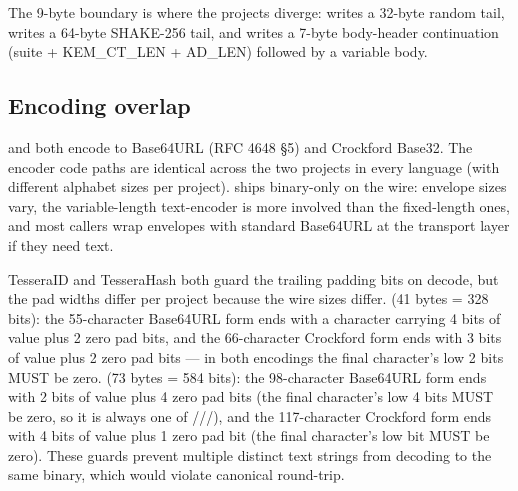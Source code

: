 The 9-byte boundary is where the projects diverge: \tesseraid{} writes a 32-byte random tail, \tesserahash{} writes a 64-byte SHAKE-256 tail, and \tesseraseal{} writes a 7-byte body-header continuation (suite + KEM\_CT\_LEN + AD\_LEN) followed by a variable body.

\subsection{Encoding overlap}

\tesseraid{} and \tesserahash{} both encode to Base64URL (RFC 4648 §5) and Crockford Base32. The encoder code paths are identical across the two projects in every language (with different alphabet sizes per project). \tesseraseal{} ships binary-only on the wire: envelope sizes vary, the variable-length text-encoder is more involved than the fixed-length ones, and most callers wrap envelopes with standard Base64URL at the transport layer if they need text.

TesseraID and TesseraHash both guard the trailing padding bits on decode, but the pad widths differ per project because the wire sizes differ. \tesseraid{} (41 bytes = 328 bits): the 55-character Base64URL form ends with a character carrying 4 bits of value plus 2 zero pad bits, and the 66-character Crockford form ends with 3 bits of value plus 2 zero pad bits --- in both encodings the final character's low 2 bits MUST be zero. \tesserahash{} (73 bytes = 584 bits): the 98-character Base64URL form ends with 2 bits of value plus 4 zero pad bits (the final character's low 4 bits MUST be zero, so it is always one of ///), and the 117-character Crockford form ends with 4 bits of value plus 1 zero pad bit (the final character's low bit MUST be zero). These guards prevent multiple distinct text strings from decoding to the same binary, which would violate canonical round-trip.
